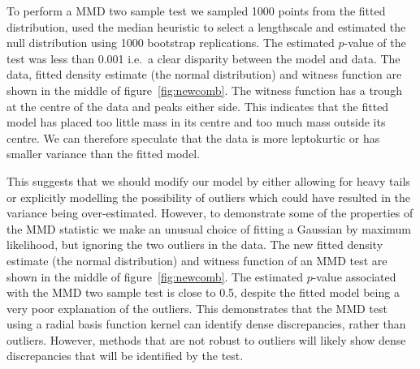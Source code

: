\documentclass{article} %
\def\ie{i.e.\ }
\begin{document}
To perform a MMD two sample test we sampled 1000 points from the fitted distribution, used the median heuristic to select a lengthscale and estimated the null distribution using 1000 bootstrap replications.
The estimated $p$-value of the test was less than 0.001 \ie a clear disparity between the model and data.
The data, fitted density estimate (the normal distribution) and witness function are shown in the middle of figure~\ref{fig:newcomb}.
The witness function has a trough at the centre of the data and peaks either side.
This indicates that the fitted model has placed too little mass in its centre and too much mass outside its centre.
We can therefore speculate that the data is more leptokurtic or has smaller variance than the fitted model.

This suggests that we should modify our model by either allowing for heavy tails or explicitly modelling the possibility of outliers which could have resulted in the variance being over-estimated.
However, to demonstrate some of the properties of the MMD statistic we make an unusual choice of fitting a Gaussian by maximum likelihood, but ignoring the two outliers in the data.
The new fitted density estimate (the normal distribution) and witness function of an MMD test are shown in the middle of figure~\ref{fig:newcomb}.
The estimated $p$-value associated with the MMD two sample test is close to 0.5, despite the fitted model being a very poor explanation of the outliers.
This demonstrates that the MMD test using a radial basis function kernel can identify dense discrepancies, rather than outliers.
However, methods that are not robust to outliers will likely show dense discrepancies that will be identified by the test.
\end{document}
